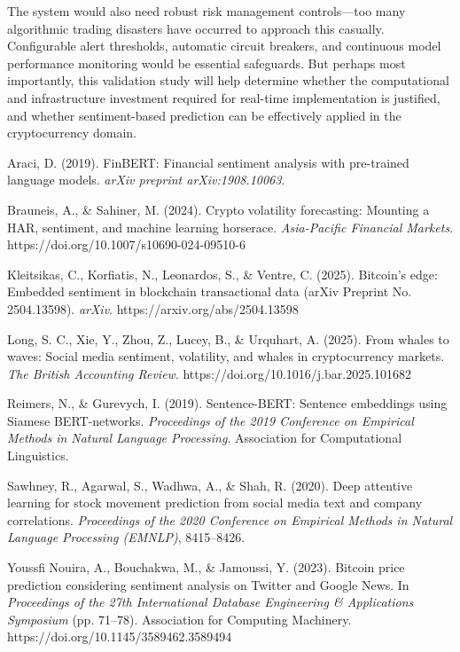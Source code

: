 \documentclass[11pt,twocolumn]{article}
\begin{document}
The system would also need robust risk management controls—too many algorithmic trading disasters have occurred to approach this casually. Configurable alert thresholds, automatic circuit breakers, and continuous model performance monitoring would be essential safeguards. But perhaps most importantly, this validation study will help determine whether the computational and infrastructure investment required for real-time implementation is justified, and whether sentiment-based prediction can be effectively applied in the cryptocurrency domain.


\begin{thebibliography}{00}
Araci, D. (2019). FinBERT: Financial sentiment analysis with pre-trained language models. \textit{arXiv preprint arXiv:1908.10063}.

Brauneis, A., \& Sahiner, M. (2024). Crypto volatility forecasting: Mounting a HAR, sentiment, and machine learning horserace. \textit{Asia-Pacific Financial Markets}. https://doi.org/10.1007/s10690-024-09510-6


Kleitsikas, C., Korfiatis, N., Leonardos, S., \& Ventre, C. (2025). Bitcoin's edge: Embedded sentiment in blockchain transactional data (arXiv Preprint No. 2504.13598). \textit{arXiv}. https://arxiv.org/abs/2504.13598

Long, S. C., Xie, Y., Zhou, Z., Lucey, B., \& Urquhart, A. (2025). From whales to waves: Social media sentiment, volatility, and whales in cryptocurrency markets. \textit{The British Accounting Review}. https://doi.org/10.1016/j.bar.2025.101682

Reimers, N., \& Gurevych, I. (2019). Sentence-BERT: Sentence embeddings using Siamese BERT-networks. \textit{Proceedings of the 2019 Conference on Empirical Methods in Natural Language Processing}. Association for Computational Linguistics.

Sawhney, R., Agarwal, S., Wadhwa, A., \& Shah, R. (2020). Deep attentive learning for stock movement prediction from social media text and company correlations. \textit{Proceedings of the 2020 Conference on Empirical Methods in Natural Language Processing (EMNLP)}, 8415–8426.

Youssfi Nouira, A., Bouchakwa, M., \& Jamoussi, Y. (2023). Bitcoin price prediction considering sentiment analysis on Twitter and Google News. In \textit{Proceedings of the 27th International Database Engineering \& Applications Symposium} (pp. 71–78). Association for Computing Machinery. https://doi.org/10.1145/3589462.3589494
\end{thebibliography}
\end{document}
